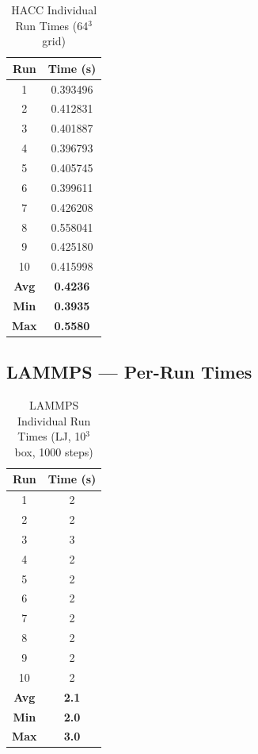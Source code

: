 \documentclass[12pt,a4paper]{article}
\begin{document}
\begin{table}[H]
\centering
\caption{HACC Individual Run Times (64$^3$ grid)}
\begin{tabular}{cc}
\toprule
\textbf{Run} & \textbf{Time (s)} \\
\midrule
1  & 0.393496 \\ 2  & 0.412831 \\ 3  & 0.401887 \\ 4  & 0.396793 \\ 5  & 0.405745 \\
6  & 0.399611 \\ 7  & 0.426208 \\ 8  & 0.558041 \\ 9  & 0.425180 \\ 10 & 0.415998 \\
\midrule
\textbf{Avg} & \textbf{0.4236} \\
\textbf{Min} & \textbf{0.3935} \\
\textbf{Max} & \textbf{0.5580} \\
\bottomrule
\end{tabular}
\end{table}

\subsection{LAMMPS --- Per-Run Times}

\begin{table}[H]
\centering
\caption{LAMMPS Individual Run Times (LJ, 10$^3$ box, 1000 steps)}
\begin{tabular}{cc}
\toprule
\textbf{Run} & \textbf{Time (s)} \\
\midrule
1  & 2 \\ 2  & 2 \\ 3  & 3 \\ 4  & 2 \\ 5  & 2 \\
6  & 2 \\ 7  & 2 \\ 8  & 2 \\ 9  & 2 \\ 10 & 2 \\
\midrule
\textbf{Avg} & \textbf{2.1} \\
\textbf{Min} & \textbf{2.0} \\
\textbf{Max} & \textbf{3.0} \\
\bottomrule
\end{tabular}
\end{table}
\end{document}

